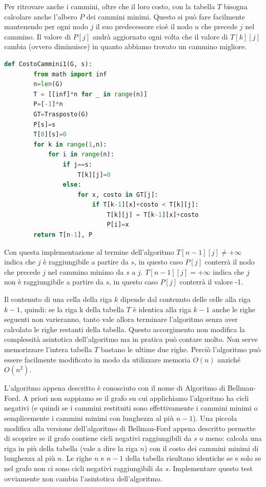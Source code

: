 Per ritrovare anche i cammini, oltre che il loro costo, con la tabella $T$ bisogna calcolare anche l'albero $P$ dei cammini minimi. Questo si può fare facilmente mantenendo per ogni nodo $j$ il suo predecessore cioè il nodo $u$ che precede $j$ nel cammino. Il valore di $P[j]$ andrà aggiornato ogni volta che il valore di $T[k][j]$ cambia (ovvero diminuisce) in quanto abbiamo trovato un cammino migliore.

\begin{lstlisting}[language=Python]
    def CostoCammini1(G, s):
        from math import inf
        n=len(G)
        T = [[inf]*n for _ in range(n)]
        P=[-1]*n
        GT=Trasposto(G)
        P[s]=s
        T[0][s]=0 
        for k in range(1,n):
            for i in range(n):
                if j==s:
                    T[k][j]=0
                else: 
                    for x, costo in GT[j]:
                        if T[k-1][x]+costo < T[k][j]:
                            T[k][j] = T[k-1][x]+costo
                            P[i]=x
        return T[n-1], P
\end{lstlisting}
Con questa implementazione al termine dell'algoritmo $T[n-1][j]\neq +\infty$ indica che $j$ è raggiungibile a partire da $s$, in questo caso $P[j]$ conterrà il nodo che precede $j$ nel cammino minimo da $s$ a $j$. $T[n-1][j]=+\infty$ indica che $j$ non è raggiungibile a partire da $s$, in questo caso $P[j]$ conterrà il valore -1.

Il contenuto di una cella della riga $k$ dipende dal contenuto delle celle alla riga $k-1$, quindi: se la riga k della tabella $T$ è identica alla riga $k-1$ anche le righe seguenti non varieranno, tanto vale allora terminare l'algoritmo senza aver calcolato le righe restanti della tabella. Questo accorgimento non modifica la complessità asintotica dell'algoritmo ma in pratica può contare molto. Non serve memorizzare l'intera tabella $T$ bastano le ultime due righe. Perciò l'algoritmo può essere facilmente modificato in modo da utilizzare memoria $O(n)$ anziché $O(n^2)$.

L'algoritmo appena descritto è conosciuto con il nome di Algoritmo di Bellman-Ford. A priori non sappiamo se il grafo su cui applichiamo l'algoritmo ha cicli negativi (e quindi se i cammini restituiti sono effettivamente i cammini minimi o semplicemente i cammini minimi con lunghezza al più $n-1$). Una piccola modifica alla versione dell'algoritmo di Bellman-Ford appena descritto permette di scoprire se il grafo contiene cicli negativi  raggiungibili da $s$ o meno: calcola una riga in più della tabella (vale a dire la riga $n$) con il costo dei cammini minimi di lunghezza al più $n$. Le righe $n$ e $n-1$ della tabella risultano identiche se e solo se nel grafo non ci sono cicli negativi raggiungibili da $s$. Implementare questo test ovviamente non cambia l'asintotica dell'algoritmo.

